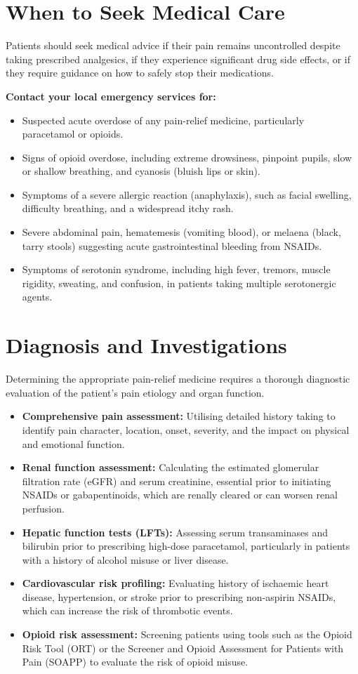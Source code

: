 \section*{When to Seek Medical Care}
Patients should seek medical advice if their pain remains uncontrolled despite taking prescribed analgesics, if they experience significant drug side effects, or if they require guidance on how to safely stop their medications.

\textbf{Contact your local emergency services for:}
\begin{itemize}
    \item Suspected acute overdose of any pain-relief medicine, particularly paracetamol or opioids.
    \item Signs of opioid overdose, including extreme drowsiness, pinpoint pupils, slow or shallow breathing, and cyanosis (bluish lips or skin).
    \item Symptoms of a severe allergic reaction (anaphylaxis), such as facial swelling, difficulty breathing, and a widespread itchy rash.
    \item Severe abdominal pain, hematemesis (vomiting blood), or melaena (black, tarry stools) suggesting acute gastrointestinal bleeding from NSAIDs.
    \item Symptoms of serotonin syndrome, including high fever, tremors, muscle rigidity, sweating, and confusion, in patients taking multiple serotonergic agents.
\end{itemize}

\section*{Diagnosis and Investigations}
Determining the appropriate pain-relief medicine requires a thorough diagnostic evaluation of the patient's pain etiology and organ function.

\begin{itemize}
    \item \textbf{Comprehensive pain assessment:} Utilising detailed history taking to identify pain character, location, onset, severity, and the impact on physical and emotional function.
    \item \textbf{Renal function assessment:} Calculating the estimated glomerular filtration rate (eGFR) and serum creatinine, essential prior to initiating NSAIDs or gabapentinoids, which are renally cleared or can worsen renal perfusion.
    \item \textbf{Hepatic function tests (LFTs):} Assessing serum transaminases and bilirubin prior to prescribing high-dose paracetamol, particularly in patients with a history of alcohol misuse or liver disease.
    \item \textbf{Cardiovascular risk profiling:} Evaluating history of ischaemic heart disease, hypertension, or stroke prior to prescribing non-aspirin NSAIDs, which can increase the risk of thrombotic events.
    \item \textbf{Opioid risk assessment:} Screening patients using tools such as the Opioid Risk Tool (ORT) or the Screener and Opioid Assessment for Patients with Pain (SOAPP) to evaluate the risk of opioid misuse.
\end{itemize}

